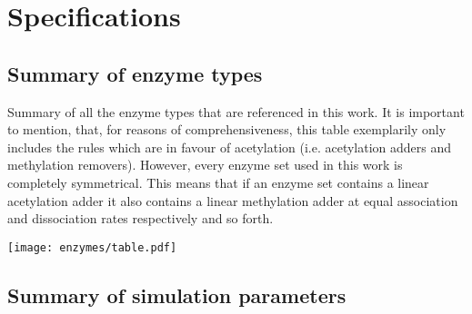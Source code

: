 \chapter{Specifications}
\label{app:RunSpec}

\section{Summary of enzyme types}

\begin{table}[htbp!]
    \caption{Summary of all the enzyme types that are referenced in this work. It is important to mention, that, for reasons of comprehensiveness, this table exemplarily only includes the rules which are in favour of acetylation (i.e. acetylation adders and methylation removers). However, every enzyme set used in this work is completely symmetrical. This means that if an enzyme set contains a linear acetylation adder it also contains a linear methylation adder at equal association and dissociation rates respectively and so forth.}
    \texttt{[image: enzymes/table.pdf]}
    \label{img:enzymeTypeSummary}
\end{table}

\section{Summary of simulation parameters}

